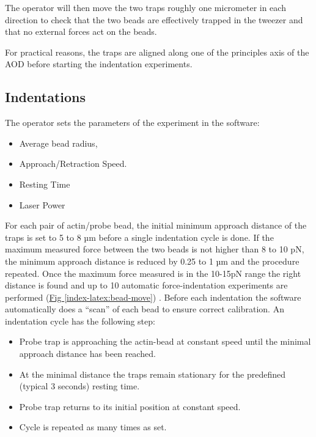 \documentclass[A4paperpaper,11pt,english]{sphinxmanual}
\begin{document}
The operator will then move the two traps roughly one micrometer in each
direction to check that the two beads are effectively trapped in the tweezer and
that no external forces act on the beads.

For practical reasons, the traps are aligned along one of the principles axis
of the AOD before starting the indentation experiments.


\subsection{Indentations}
\label{index-latex:indentations}
The operator sets the parameters of the experiment in the software:
\begin{itemize}
\item {} 
Average bead radius,

\item {} 
Approach/Retraction Speed.

\item {} 
Resting Time

\item {} 
Laser Power

\end{itemize}

For each pair of actin/probe bead, the initial minimum approach distance of the
traps is set to 5 to 8 µm before a single indentation cycle is done. If the
maximum measured force between the two beads is not higher than 8 to 10 pN, the
minimum approach distance is reduced by 0.25 to 1 µm and the procedure
repeated. Once the maximum force measured is in the 10-15pN range the right
distance is found and up to 10 automatic force-indentation experiments are
performed (\hyperref[index-latex:bead-move]{Fig  \ref*{index-latex:bead-move}}) . Before each indentation the software automatically does a ``scan'' of
each bead to ensure correct calibration. An indentation cycle has the
following step:
\begin{itemize}
\item {} 
Probe trap is approaching the actin-bead at constant speed until the minimal approach distance has been reached.

\item {} 
At the minimal distance the traps remain stationary for the predefined (typical 3 seconds) resting time.

\item {} 
Probe trap returns to its initial position at constant speed.

\item {} 
Cycle is repeated as many times as set.

\end{itemize}
\end{document}
